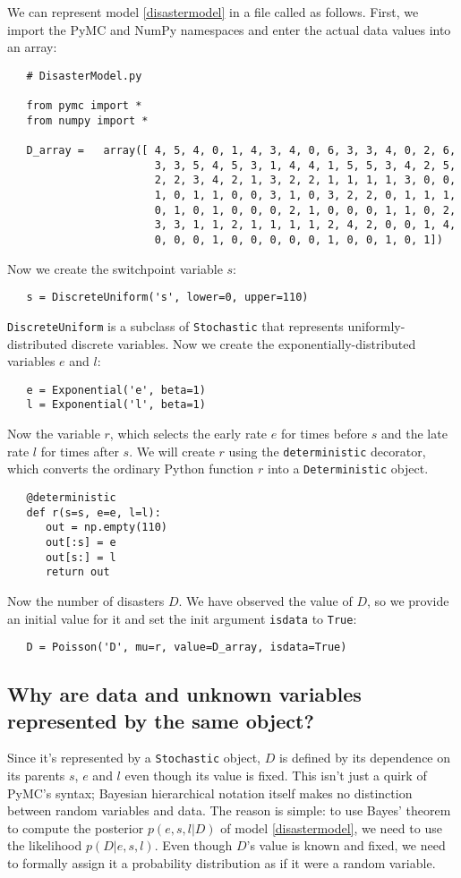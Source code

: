 We can represent model \ref{disastermodel} in a file called  as follows. First, we import the PyMC and NumPy namespaces and enter the actual data values into an array:
\begin{verbatim}
   # DisasterModel.py
   
   from pymc import *
   from numpy import *

   D_array =   array([ 4, 5, 4, 0, 1, 4, 3, 4, 0, 6, 3, 3, 4, 0, 2, 6,
                       3, 3, 5, 4, 5, 3, 1, 4, 4, 1, 5, 5, 3, 4, 2, 5,
                       2, 2, 3, 4, 2, 1, 3, 2, 2, 1, 1, 1, 1, 3, 0, 0,
                       1, 0, 1, 1, 0, 0, 3, 1, 0, 3, 2, 2, 0, 1, 1, 1,
                       0, 1, 0, 1, 0, 0, 0, 2, 1, 0, 0, 0, 1, 1, 0, 2,
                       3, 3, 1, 1, 2, 1, 1, 1, 1, 2, 4, 2, 0, 0, 1, 4,
                       0, 0, 0, 1, 0, 0, 0, 0, 0, 1, 0, 0, 1, 0, 1])
\end{verbatim} 
Now we create the switchpoint variable $s$:
\begin{verbatim}
   s = DiscreteUniform('s', lower=0, upper=110)   
\end{verbatim}
\texttt{DiscreteUniform} is a subclass of \texttt{Stochastic} that represents uniformly-distributed discrete variables. Now we create the exponentially-distributed variables $e$ and $l$:
\begin{verbatim}
   e = Exponential('e', beta=1)
   l = Exponential('l', beta=1)   
\end{verbatim}
Now the variable $r$, which selects the early rate $e$ for times before $s$ and the late rate $l$ for times after $s$. We will create $r$ using the \texttt{deterministic} decorator, which converts the ordinary Python function $r$ into a \texttt{Deterministic} object.
\begin{verbatim}
   @deterministic
   def r(s=s, e=e, l=l):
      out = np.empty(110)
      out[:s] = e
      out[s:] = l
      return out
\end{verbatim}
Now the number of disasters $D$. We have observed the value of $D$, so we provide an initial value for it and set the init argument \texttt{isdata} to \texttt{True}:
\begin{verbatim}
   D = Poisson('D', mu=r, value=D_array, isdata=True)
\end{verbatim}

\subsection*{Why are data and unknown variables represented by the same object?}
Since it's represented by a \texttt{Stochastic} object, $D$ is defined by its dependence on its parents $s$, $e$ and $l$ even though its value is fixed. This isn't just a quirk of PyMC's syntax; Bayesian hierarchical notation itself makes no distinction between random variables and data. The reason is simple: to use Bayes' theorem to compute the posterior $p(e,s,l|D)$ of model \ref{disastermodel}, we need to use the likelihood $p(D|e,s,l)$. Even though $D$'s value is known and fixed, we need to formally assign it a probability distribution as if it were a random variable.

